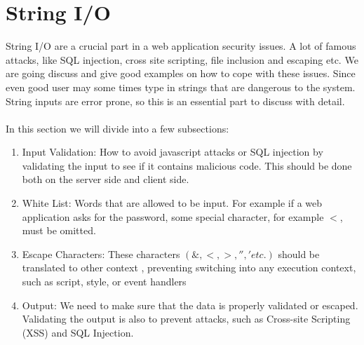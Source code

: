 \documentclass[10pt, a4paper]{article}
\begin{document}


%   
\section{String I/O}
String I/O are a crucial part in a web application security issues. A lot of famous attacks, like SQL injection,
cross site scripting, file inclusion and escaping etc. We are going discuss and give good examples on how
to cope with these issues. Since even good user may some times type in strings that are dangerous to the system.
String inputs are error prone, so this is an essential part to discuss with detail.
\\\\
In this section we will divide into a few subsections: 
\begin{enumerate}[label=\textbf{\arabic*.}]
    \item
	Input Validation: How to avoid javascript attacks or SQL injection by validating the input to see if it contains malicious code. This should be done both on the server side and client side.
    \item
    	White List: Words that are allowed to be input. For example if a web application asks for the password, some special character, for example $<$, must be omitted.
     \item
        Escape Characters: These characters $(\&, <, >, '', ' etc.)$ should be translated to other context , preventing switching into any execution context, such as script, style, or event handlers
     \item
     	Output:  We need to make sure that the data is properly validated or escaped. Validating the output is also to prevent attacks, such as Cross-site Scripting (XSS) and SQL Injection.
\end{enumerate}

\end{document}
